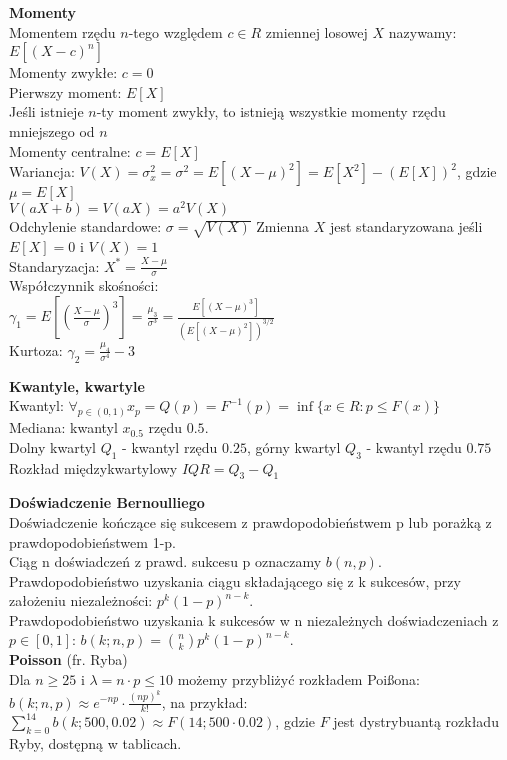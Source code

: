 \documentclass[10pt,landscape,a4paper,notitlepage]{article}
\begin{document}
\begin{multicols*}{4}
        \noindent\textbf{\large Momenty}\\
        Momentem rzędu $n$-tego względem $c\in R$ zmiennej losowej $X$ nazywamy: $E[(X-c)^n]$\\
        Momenty zwykłe: $c=0$\\
        Pierwszy moment: $E[X]$\\
        Jeśli istnieje $n$-ty moment zwykły, to istnieją wszystkie momenty rzędu mniejszego od $n$\\
        Momenty centralne: $c=E[X]$\\
        Wariancja: $V(X)=\sigma_x^2=\sigma^2=E[(X-\mu)^2]=E[X^2]-(E[X])^2$, gdzie $\mu=E[X]$\\
        $V(aX+b)=V(aX)=a^2V(X)$\\
        Odchylenie standardowe: $\sigma=\sqrt{V(X)}$
        Zmienna $X$ jest standaryzowana jeśli $E[X]=0$ i $V(X)=1$\\
        Standaryzacja: $X^*=\frac{X-\mu}{\sigma}$\\
        Współczynnik skośności:\\
        $\gamma_1=E\left[\left(\frac{X-\mu}{\sigma}\right)^3\right]=\frac{\mu_3}{\sigma^3}=\frac{E[(X-\mu)^3]}{(E[(X-\mu)^2])^{3/2}}$\\
        Kurtoza: $\gamma_2=\frac{\mu_4}{\sigma^4}-3$

        \noindent\textbf{\large Kwantyle, kwartyle}\\
        Kwantyl: $\forall_{p\in(0,1)} x_p=Q(p)=F^{-1}(p)=\inf \{x\in R:p\leq F(x)\}$\\
        Mediana: kwantyl $x_{0.5}$ rzędu $0.5$.\\
        Dolny kwartyl $Q_1$ - kwantyl rzędu $0.25$, górny kwartyl $Q_3$ - kwantyl rzędu $0.75$\\
        Rozkład międzykwartylowy $IQR=Q_3-Q_1$

        \noindent \textbf{\large Doświadczenie Bernoulliego}\\
        Doświadczenie kończące się sukcesem z prawdopodobieństwem p lub porażką z prawdopodobieństwem 1-p.\\
        Ciąg n doświadczeń z prawd. sukcesu p oznaczamy $b(n,p)$.\\
        Prawdopodobieństwo uzyskania ciągu składającego się z k sukcesów, przy założeniu niezależności: $p^k(1-p)^{n-k}$.\\
        Prawdopodobieństwo uzyskania k sukcesów w n niezależnych doświadczeniach z $p\in[0,1]$: $b(k;n,p)=\binom{n}{k}p^k(1-p)^{n-k}$.\\
        \textbf{Poisson} (fr. Ryba)\\
        Dla $n\geq25$ i $\lambda = n\cdot p \leq10$ możemy przybliżyć rozkładem Poi\ss ona: $b(k;n,p)\approx e^{-np}\cdot\frac{(np)^k}{k!}$, na przykład:\\
        $\sum_{k=0}^{14}b(k;500,0.02)\approx F(14;500\cdot0.02)$, gdzie $F$ jest dystrybuantą rozkładu Ryby, dostępną w tablicach.


\end{multicols*}
\end{document}
